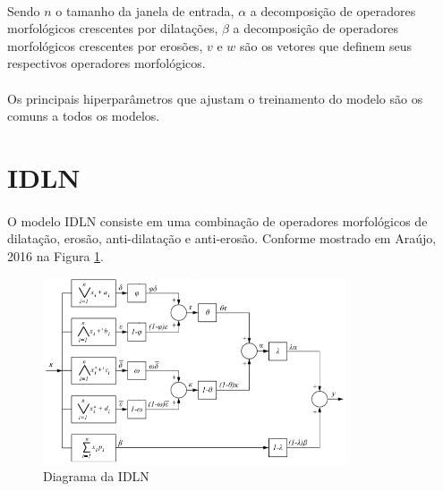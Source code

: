 \paragraph{} Sendo \(n\) o tamanho da janela de entrada, \(\alpha\) a decomposição de operadores morfológicos crescentes por dilatações, \(\beta\) a decomposição de operadores morfológicos crescentes por erosões, \(v\) e \(w\) são os vetores que definem seus respectivos operadores morfológicos.

\paragraph{} Os principais hiperparâmetros que ajustam o treinamento do modelo são os comuns a todos os modelos.

\section{\acf{IDLN}}

\paragraph{} O modelo \ac{IDLN} consiste em uma combinação de operadores morfológicos de dilatação, erosão, anti-dilatação e anti-erosão. Conforme mostrado em Araújo, 2016 \cite{Araujo16} na Figura \ref{fig:idln_diagram}.

\begin{figure}
	\begin{center}
		\begin{center}
			\includegraphics[width=0.8\textwidth]{figuras/idln_diagram.png}
			\caption{Diagrama da \acs{IDLN}}
			\label{fig:idln_diagram}
		\end{center}

	\end{center}
\end{figure}

